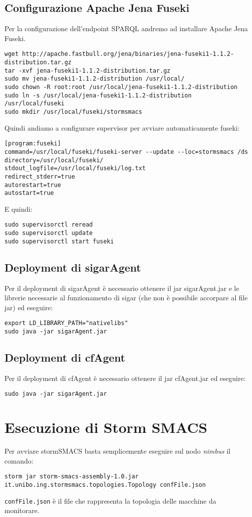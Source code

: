\documentclass[12pt]{article}
\begin{document}
\subsection{Configurazione Apache Jena Fuseki}
Per la configurazione dell'endpoint SPARQL andremo ad installare Apache Jena Fuseki.
\begin{lstlisting}
wget http://apache.fastbull.org/jena/binaries/jena-fuseki1-1.1.2-distribution.tar.gz
tar -xvf jena-fuseki1-1.1.2-distribution.tar.gz
sudo mv jena-fuseki1-1.1.2-distribution /usr/local/
sudo chown -R root:root /usr/local/jena-fuseki1-1.1.2-distribution
sudo ln -s /usr/local/jena-fuseki1-1.1.2-distribution /usr/local/fuseki
sudo mkdir /usr/local/fuseki/stormsmacs
\end{lstlisting}
Quindi andiamo a configurare supervisor per avviare automaticamente fuseki:
\begin{lstlisting}
[program:fuseki]
command=/usr/local/fuseki/fuseki-server --update --loc=stormsmacs /ds
directory=/usr/local/fuseki/
stdout_logfile=/usr/local/fuseki/log.txt
redirect_stderr=true
autorestart=true
autostart=true
\end{lstlisting}
E quindi:
\begin{lstlisting}
sudo supervisorctl reread
sudo supervisorctl update
sudo supervisorctl start fuseki
\end{lstlisting}
\subsection{Deployment di sigarAgent}
Per il deployment di sigarAgent \`e necessario ottenere il jar sigarAgent.jar e le librerie necessarie al funzionamento di sigar (che non \`e possibile accorpare al file jar) ed eseguire:
\begin{lstlisting}
export LD_LIBRARY_PATH="nativelibs"
sudo java -jar sigarAgent.jar
\end{lstlisting}
\subsection{Deployment di cfAgent}
Per il deployment di cfAgent \`e necessario ottenere il jar cfAgent.jar ed eseguire:
\begin{lstlisting}
sudo java -jar sigarAgent.jar
\end{lstlisting}
\section{Esecuzione di Storm SMACS}
Per avviare stormSMACS basta semplicemente eseguire sul nodo \emph{nimbus} il comando:
\begin{lstlisting}
storm jar storm-smacs-assembly-1.0.jar it.unibo.ing.stormsmacs.topologies.Topology confFile.json
\end{lstlisting}
\texttt{confFile.json} \`e il file che rappresenta la topologia delle macchine da monitorare.
\newpage
\appendix
\end{document}
